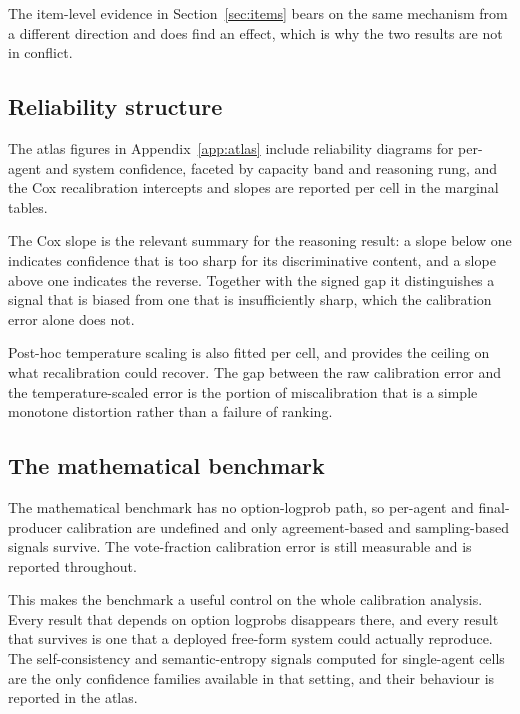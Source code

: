 The item-level evidence in Section~\ref{sec:items} bears on the same mechanism from a
different direction and does find an effect, which is why the two results are not in
conflict.

\subsection{Reliability structure}

The atlas figures in Appendix~\ref{app:atlas} include reliability diagrams for per-agent
and system confidence, faceted by capacity band and reasoning rung, and the Cox
recalibration intercepts and slopes are reported per cell in the marginal tables.

The Cox slope is the relevant summary for the reasoning result: a slope below one indicates
confidence that is too sharp for its discriminative content, and a slope above one
indicates the reverse. Together with the signed gap it distinguishes a signal that is
biased from one that is insufficiently sharp, which the calibration error alone does not.

Post-hoc temperature scaling is also fitted per cell, and provides the ceiling on what
recalibration could recover. The gap between the raw calibration error and the
temperature-scaled error is the portion of miscalibration that is a simple monotone
distortion rather than a failure of ranking.

\subsection{The mathematical benchmark}

The mathematical benchmark has no option-logprob path, so per-agent and final-producer
calibration are undefined and only agreement-based and sampling-based signals survive. The
vote-fraction calibration error is still measurable and is reported throughout.

This makes the benchmark a useful control on the whole calibration analysis. Every result
that depends on option logprobs disappears there, and every result that survives is one
that a deployed free-form system could actually reproduce. The self-consistency and
semantic-entropy signals computed for single-agent cells are the only confidence families
available in that setting, and their behaviour is reported in the atlas.
